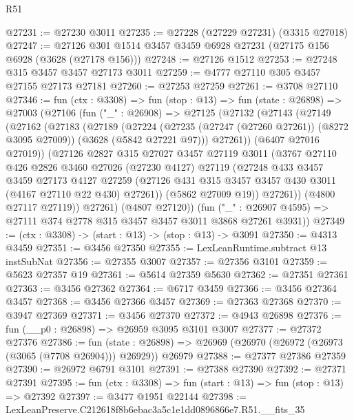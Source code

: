 \begin{lexlean}{R51}
\begin{coremodule}
@27231 := @27230 @3011
@27235 := @27228 (@27229 @27231) (@3315 @27018)
@27247 := @27126 @301 @1514 @3457 @3459 @6928 @27231 (@27175 @156 @6928 (@3628 (@27178 @156)))
@27248 := @27126 @1512
@27253 := @27248 @315 @3457 @3457 @27173 @3011
@27259 := @4777 @27110 @305 @3457 @27155 @27173 @27181
@27260 := @27253 @27259
@27261 := @3708 @27110
@27346 := fun (ctx : @3308) =>
  fun (stop : @13) =>
  fun (state : @26898) =>
  @27003
    (@27106
      (fun ("_" : @26908) =>
      @27125
        (@27132
          (@27143
            (@27149
              (@27162
                (@27183
                  (@27189
                    (@27224
                      (@27235 (@27247 (@27260 @27261)) (@8272 @3095 @27009))
                      (@3628 (@5842 @27221 @97)))
                    @27261))
                (@6407 @27016 @27019))
              (@27126
                @2827
                @315
                @27027
                @3457
                @27119
                @3011
                (@3767
                  @27110
                  @426
                  @2826
                  @3460
                  @27026
                  (@27230 @4127)
                  @27119
                  (@27248
                    @433
                    @3457
                    @3459
                    @27173
                    @4127
                    @27259
                    (@27126 @431 @315 @3457 @3457 @430 @3011 (@4167 @27110 @22 @430) @27261))
                  (@5862 @27009 @19))
                @27261))
            (@4800 @27117 @27119))
          @27261)
        (@4807 @27120))
      (fun ("_" : @26907 @4595) => @27111 @374 @2778 @315 @3457 @3457 @3011 @3868 @27261 @3931))
@27349 := (ctx : @3308) -> (start : @13) -> (stop : @13) -> @3091
@27350 := @4313 @3459
@27351 := @3456 @27350
@27355 := LexLeanRuntime.subtract @13 instSubNat
@27356 := @27355 @3007
@27357 := @27356 @3101
@27359 := @5623 @27357 @19
@27361 := @5614 @27359 @5630
@27362 := @27351 @27361
@27363 := @3456 @27362
@27364 := @6717 @3459
@27366 := @3456 @27364 @3457
@27368 := @3456 @27366 @3457
@27369 := @27363 @27368
@27370 := @3947 @27369
@27371 := @3456 @27370
@27372 := @4943 @26898
@27376 := fun (__p0 : @26898) => @26959 @3095 @3101 @3007
@27377 := @27372 @27376
@27386 := fun (state : @26898) =>
  @26969 (@26970 (@26972 (@26973 (@3065 (@7708 @26904))) @26929)) @26979
@27388 := @27377 @27386 @27359
@27390 := @26972 @6791 @3101
@27391 := @27388 @27390
@27392 := @27371 @27391
@27395 := fun (ctx : @3308) => fun (start : @13) => fun (stop : @13) => @27392
@27397 := @3477 @1951 @22144
@27398 := LexLeanPreserve.C212618f8b6ebac3a5c1e1dd0896866e7.R51.__fits_35

\end{coremodule}
\end{lexlean}
